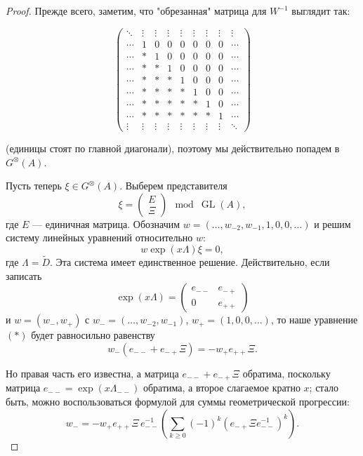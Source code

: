 \documentclass{article}
\theoremstyle{definition}
\theoremstyle{definition} %
\theoremstyle{remark}     %
\theoremstyle{definition}
\theoremstyle{definition}
\theoremstyle{definition}
\theoremstyle{definition}
\theoremstyle{definition}
\theoremstyle{definition}
\theoremstyle{definition}
\theoremstyle{definition}
\begin{document}
\begin{proof}


    Прежде всего, заметим, что "обрезанная" матрица для $W^{-1}$ выглядит так:
    

    
\[
\begin{pmatrix}
\ddots & \vdots & \vdots & \vdots & \vdots & \vdots & \vdots & \vdots & \vdots \\
\cdots & 1 & 0 & 0 & 0 & 0 & 0 & 0 & \cdots \\
\cdots & * & 1 & 0 & 0 & 0 & 0 & 0 & \cdots \\
\cdots & * & * & 1 & 0 & 0 & 0 & 0 & \cdots \\
\cdots & * & * & * & 1 & 0 & 0 & 0 & \cdots \\
\cdots & * & * & * & * & 1 & 0 & 0 & \cdots \\
\cdots & * & * & * & * & * & 1 & 0 & \cdots \\
\cdots & * & * & * & * & * & * & 1 & \cdots \\
\vdots & \vdots & \vdots & \vdots & \vdots & \vdots & \vdots & \vdots & \ddots
\end{pmatrix}
\]





(единицы стоят по главной диагонали), поэтому мы действительно попадем в  
\( G^{\otimes}(A). \)

Пусть теперь \(\xi \in G^{\otimes}(A)\). Выберем представителя  
\[
\xi = \begin{pmatrix} E \\ \Xi \end{pmatrix} \mod \operatorname{GL}(A),
\]
где \(E\) — единичная матрица. Обозначим \(w = (\dots, w_{-2}, w_{-1}, 1, 0, 0, \dots)\) и решим систему линейных уравнений относительно \(w\):
\[
w \exp(x\Lambda)\xi = 0, \tag{*}
\]
где \(\Lambda = \tilde{D}\). Эта система имеет единственное решение. Действительно, если записать  
\[
\exp(x\Lambda) = \begin{pmatrix} e_{--} & e_{-+} \\ 0 & e_{++} \end{pmatrix}
\]
и \(w = (w_-, w_+)\) с \(w_- = (\dots, w_{-2}, w_{-1})\), \(w_+ = (1, 0, 0, \dots)\), то наше уравнение \((*)\) будет равносильно равенству  
\[
w_-(e_{--} + e_{-+}\Xi) = -w_+ e_{++} \Xi.
\]

Но правая часть его известна, а матрица \(e_{--} + e_{-+}\Xi\) обратима, поскольку матрица \(e_{--} = \exp(x\Lambda_{--})\) обратима, а второе слагаемое кратно \(x\); стало быть, можно воспользоваться формулой для суммы геометрической прогрессии:
\[
w_- = -w_+ e_{++} \Xi \, e_{--}^{-1} \left( \sum_{k \ge 0} (-1)^k (e_{-+}\Xi e_{--}^{-1})^k \right).
\]



\end{proof}
\end{document}
